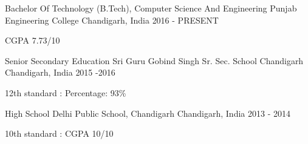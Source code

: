 \begin{cventries}
  \cventry
    {Bachelor Of Technology (B.Tech), Computer Science And Engineering}
    {Punjab Engineering College}
    {Chandigarh, India}
    {2016 - PRESENT}
    {
      \begin{cvitems}
        \item {CGPA 7.73/10}
      \end{cvitems}
    }
     \cventry
    {Senior Secondary Education}
    {Sri Guru Gobind Singh Sr. Sec. School Chandigarh}
    {Chandigarh, India}
    {2015 -2016 }
    {
      \begin{cvitems}
        \item {12th standard : Percentage: 93\%}
      \end{cvitems}
    }
    \cventry
    {High School}
    {Delhi Public School, Chandigarh}
    {Chandigarh, India}
    {2013 - 2014}
    {
      \begin{cvitems}
        \item {10th standard : CGPA 10/10}
      \end{cvitems}
    }
\end{cventries}
